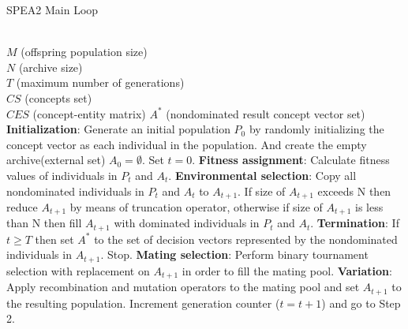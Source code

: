\begin{algorithm}
\caption{SPEA2 Main Loop}
\label{SPEA2}
\begin{algorithmic}[1]
\Require\\
$M$ (offspring population size)\\
$N$ (archive size)\\
$T$ (maximum number of generations)\\
$CS$ (concepts set)\\
$CES$ (concept-entity matrix)
\Ensure
$A^*$ (nondominated result concept vector set)
\State \textbf{Initialization}: Generate an initial population $P_0$ by randomly initializing the concept vector as each individual in the population. And create the empty archive(external set) $A_0 = \emptyset$. Set $t = 0$.
\State \textbf{Fitness assignment}: Calculate fitness values of individuals in $P_t$ and $A_t$.
\State \textbf{Environmental selection}: Copy all nondominated individuals in $P_t$ and $A_t$ to $A_{t+1}$. If size of $A_{t+1}$ exceeds N then reduce $A_{t+1}$ by means of truncation operator, otherwise if size of $A_{t+1}$ is less than N then fill $A_{t+1}$ with dominated individuals in $P_t$ and $A_t$.
\State \textbf{Termination}: If $t \geq T$ then set $A^*$ to the set of decision vectors represented by the nondominated individuals in $A_{t+1}$. Stop.
\State \textbf{Mating selection}: Perform binary tournament selection with replacement on $A_{t+1}$ in order to fill the mating pool.
\State \textbf{Variation}: Apply recombination and mutation operators to the mating pool and set $A_{t+1}$ to the resulting population. Increment generation counter ($t = t + 1$) and go to Step 2.
\end{algorithmic}
\end{algorithm}